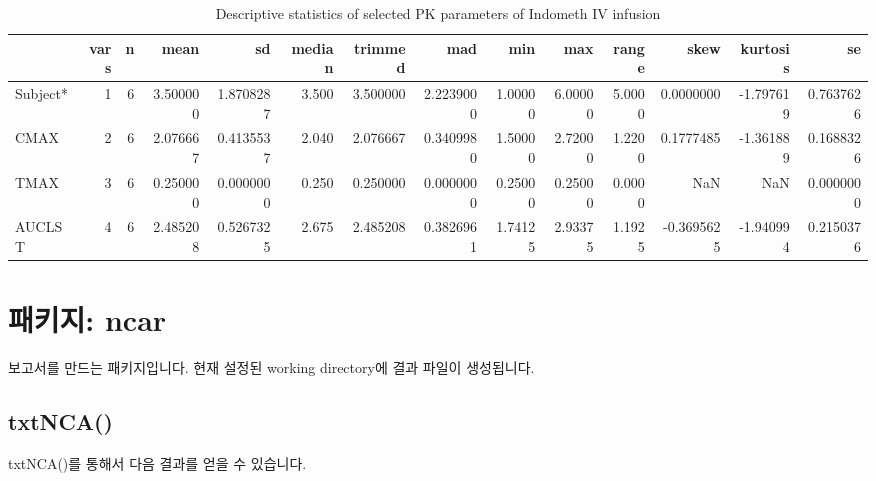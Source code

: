 \documentclass[9pt,]{krantz}
\newenvironment{Shaded}{\begin{snugshade}}{\end{snugshade}}
\newcommand{\DataTypeTok}[1]{\textcolor[rgb]{0.13,0.29,0.53}{#1}}
\newcommand{\DecValTok}[1]{\textcolor[rgb]{0.00,0.00,0.81}{#1}}
\newcommand{\KeywordTok}[1]{\textcolor[rgb]{0.13,0.29,0.53}{\textbf{#1}}}
\newcommand{\NormalTok}[1]{#1}
\newcommand{\OperatorTok}[1]{\textcolor[rgb]{0.81,0.36,0.00}{\textbf{#1}}}
\newcommand{\StringTok}[1]{\textcolor[rgb]{0.31,0.60,0.02}{#1}}
\begin{document}
\begin{table}[t]

\caption{\label{tab:indodesc}Descriptive statistics of selected PK parameters of Indometh IV infusion}
\centering
\begin{tabular}{lrrrrrrrrrrrrr}
\toprule
  & vars & n & mean & sd & median & trimmed & mad & min & max & range & skew & kurtosis & se\\
\midrule
Subject* & 1 & 6 & 3.500000 & 1.8708287 & 3.500 & 3.500000 & 2.2239000 & 1.00000 & 6.00000 & 5.0000 & 0.0000000 & -1.797619 & 0.7637626\\
CMAX & 2 & 6 & 2.076667 & 0.4135537 & 2.040 & 2.076667 & 0.3409980 & 1.50000 & 2.72000 & 1.2200 & 0.1777485 & -1.361889 & 0.1688326\\
TMAX & 3 & 6 & 0.250000 & 0.0000000 & 0.250 & 0.250000 & 0.0000000 & 0.25000 & 0.25000 & 0.0000 & NaN & NaN & 0.0000000\\
AUCLST & 4 & 6 & 2.485208 & 0.5267325 & 2.675 & 2.485208 & 0.3826961 & 1.74125 & 2.93375 & 1.1925 & -0.3695625 & -1.940994 & 0.2150376\\
\bottomrule
\end{tabular}
\end{table}

\hypertarget{ncar}{%
\chapter{패키지: ncar}\label{ncar}}

보고서를 만드는 패키지입니다. 현재 설정된 working directory에 결과 파일이 생성됩니다.

\hypertarget{txtnca}{%
\section{txtNCA()}\label{txtnca}}

txtNCA()를 통해서 다음 결과를 얻을 수 있습니다.

\begin{Shaded}
\end{Shaded}
\end{document}
